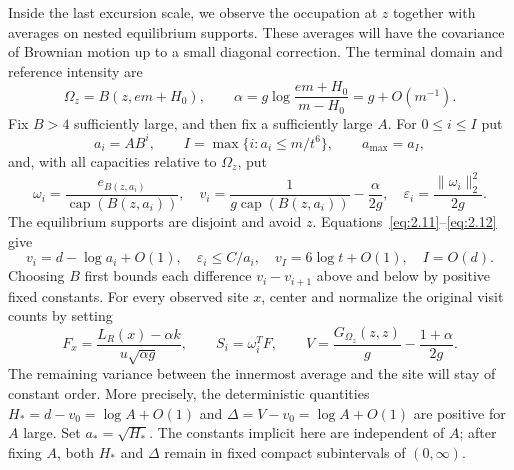 \documentclass[11pt,letterpaper,reqno]{amsart}
\numberwithin{equation}{section}
\theoremstyle{remark}
\begin{document}
\label{sec:averageconstraints}
Inside the last excursion scale, we observe the occupation at $z$ together with averages on nested equilibrium supports. These averages will have the covariance of Brownian motion up to a small diagonal correction. The terminal domain and reference intensity are
\begin{equation}\label{eq:5.6}
\Omega_z=B(z,em+H_0),\qquad
\alpha=g\log\frac{em+H_0}{m-H_0}=g+O(m^{-1}).
\end{equation}
Fix $B>4$ sufficiently large, and then fix a sufficiently large $A$.
For $0\le i\le I$ put
\begin{equation}\label{eq:5.7}
a_i=AB^i,\qquad I=\max\{i:a_i\le m/t^6\},\qquad a_{\max}=a_I,
\end{equation}
and, with all capacities relative to $\Omega_z$, put
\begin{equation}\label{eq:5.8}
\omega_i=\frac{e_{B(z,a_i)}}{\operatorname{cap}(B(z,a_i))},\quad
v_i=\frac1{g\operatorname{cap}(B(z,a_i))}-\frac\alpha{2g},\quad
\varepsilon_i=\frac{\|\omega_i\|_2^2}{2g}.
\end{equation}
The equilibrium supports are disjoint and avoid $z$. Equations~\eqref{eq:2.11}--\eqref{eq:2.12} give
\begin{equation}\label{eq:5.9}
v_i=d-\log a_i+O(1),\quad \varepsilon_i\le C/a_i,\quad
v_I=6\log t+O(1),\quad I=O(d).
\end{equation}
Choosing $B$ first bounds each difference $v_i-v_{i+1}$ above and below by positive fixed constants.
For every observed site $x$, center and normalize the original visit counts by setting
\[
F_x=\frac{L_R(x)-\alpha k}{u\sqrt{\alpha g}},\qquad
S_i=\omega_i^TF,\qquad
V=\frac{G_{\Omega_z}(z,z)}g-\frac{1+\alpha}{2g}.
\]
The remaining variance between the innermost average and the site will stay of constant order. More precisely, the deterministic quantities $H_*=d-v_0=\log A+O(1)$ and
$\Delta=V-v_0=\log A+O(1)$ are positive for $A$ large. Set $a_*=\sqrt{H_*}$.
The constants implicit here are independent of $A$; after fixing $A$, both $H_*$ and $\Delta$ remain in fixed compact subintervals of $(0,\infty)$.
\end{document}
